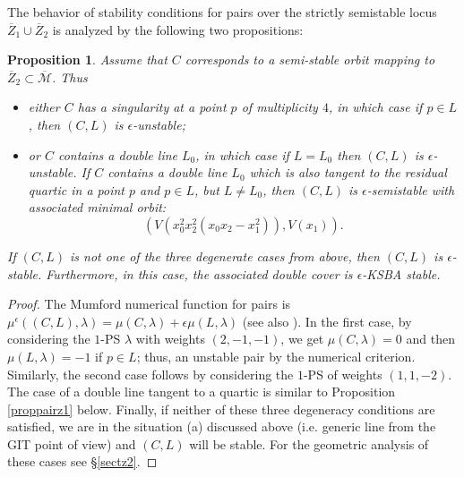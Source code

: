 \documentclass{amsart}
\numberwithin{equation}{section}
\theoremstyle{plain}
\newtheorem{proposition}[equation]{Proposition}
\theoremstyle{remark}
\theoremstyle{definition}
\newcommand{\calM}{\mathcal{M}}
\begin{document}
The behavior of stability conditions for pairs over the strictly semistable locus  $\overline Z_1\cup \overline Z_2$ is analyzed by the following two propositions:
\begin{proposition}\label{proppairz2}
Assume that $C$ corresponds to a semi-stable orbit mapping to $\overline{Z}_2\subset \overline{\calM}$. Thus 
\begin{itemize}
\item[i)] either $C$ has a singularity at a point $p$ of multiplicity $4$, in which case if $p\in L$, then  $(C,L)$ is $\epsilon$-unstable;
\item[ii)] or $C$ contains a double line $L_0$, in which case if $L=L_0$ then 
$(C,L)$ is $\epsilon$-unstable. If $C$ contains a double line $L_0$ which is also tangent to the residual quartic in  a point $p$ and $p\in L$, but $L\neq L_0$, then $(C,L)$ is $\epsilon$-semistable with associated minimal orbit: 
$$\left(V(x_0^2x_2^2(x_0x_2-x_1^2)), V(x_1)\right).$$
\end{itemize}
If $(C,L)$ is not one of the three degenerate cases from above, then $(C,L)$ is $\epsilon$-stable.  Furthermore, in this case, the associated double cover is $\epsilon$-KSBA stable. 
\end{proposition}
\begin{proof} The Mumford numerical function for pairs is $\mu^\epsilon((C,L),\lambda)=\mu(C,\lambda)+\epsilon \mu(L,\lambda)$ (see also \cite[Sect. 2]{raduthesis}). In the first case, by considering the $1$-PS $\lambda$ with weights $(2,-1,-1)$, we get $\mu(C,\lambda)=0$ and then $\mu(L,\lambda)=-1$ if $p\in L$; thus, an unstable pair by the numerical criterion. Similarly, the second case follows by considering the $1$-PS of weights $(1,1,-2)$. The case of a double line tangent to a quartic is similar to Proposition \ref{proppairz1} below. Finally, if neither of these three degeneracy conditions are satisfied, we are in the situation (a) discussed above (i.e. generic line from the GIT point of view) and $(C,L)$ will be stable. For the geometric analysis of these cases see \S\ref{sectz2}. 
\end{proof}
\end{document}
